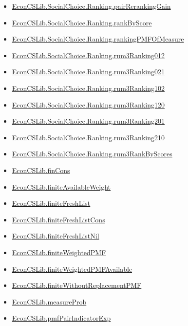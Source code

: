 \documentclass[10pt]{article}
\begin{document}
\begin{itemize}[leftmargin=1.2em]
\begin{itemize}[leftmargin=1.2em]
\item \hyperlink{library-prerequisite-d3b381d476267785}{EconCSLib.SocialChoice.Ranking.pairRerankingGain}
\item \hyperlink{library-prerequisite-4d0316233c2913da}{EconCSLib.SocialChoice.Ranking.rankByScore}
\item \hyperlink{library-prerequisite-3d857727212e6236}{EconCSLib.SocialChoice.Ranking.rankingPMFOfMeasure}
\item \hyperlink{library-prerequisite-9282609ac289eae1}{EconCSLib.SocialChoice.Ranking.rum3Ranking012}
\item \hyperlink{library-prerequisite-3e9037b4cf76ac78}{EconCSLib.SocialChoice.Ranking.rum3Ranking021}
\item \hyperlink{library-prerequisite-d6840f3f435bf0a3}{EconCSLib.SocialChoice.Ranking.rum3Ranking102}
\item \hyperlink{library-prerequisite-17cdcd166ffcfa57}{EconCSLib.SocialChoice.Ranking.rum3Ranking120}
\item \hyperlink{library-prerequisite-88da1ce8c8de0862}{EconCSLib.SocialChoice.Ranking.rum3Ranking201}
\item \hyperlink{library-prerequisite-11023713299f4bb8}{EconCSLib.SocialChoice.Ranking.rum3Ranking210}
\item \hyperlink{library-prerequisite-2b57daef13f9e5a2}{EconCSLib.SocialChoice.Ranking.rum3RankByScores}
\item \hyperlink{library-prerequisite-d3a1fe6e17d1ebe8}{EconCSLib.finCons}
\item \hyperlink{library-prerequisite-4aa064b5cbd66ed3}{EconCSLib.finiteAvailableWeight}
\item \hyperlink{library-prerequisite-637b06ac0adfcac1}{EconCSLib.finiteFreshList}
\item \hyperlink{library-prerequisite-517099bc7eacc408}{EconCSLib.finiteFreshListCons}
\item \hyperlink{library-prerequisite-010f5218e34f7dbc}{EconCSLib.finiteFreshListNil}
\item \hyperlink{library-prerequisite-8598d8001b9c1939}{EconCSLib.finiteWeightedPMF}
\item \hyperlink{library-prerequisite-478178a796f1a098}{EconCSLib.finiteWeightedPMFAvailable}
\item \hyperlink{library-prerequisite-17cb3d8406f594aa}{EconCSLib.finiteWithoutReplacementPMF}
\item \hyperlink{library-prerequisite-7ae22d5411bd7792}{EconCSLib.measureProb}
\item \hyperlink{library-prerequisite-197097ef6d41e4d7}{EconCSLib.pmfPairIndicatorExp}

\end{itemize}
\end{itemize}
\end{document}
